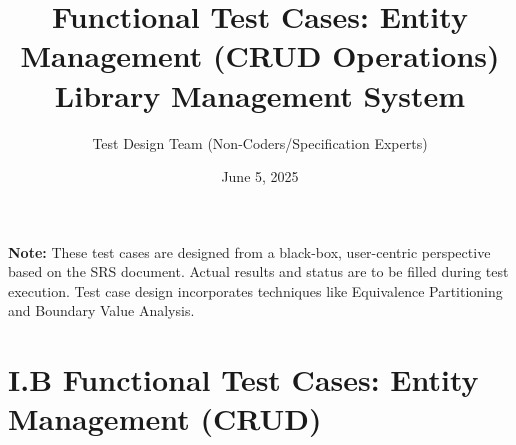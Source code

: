 \documentclass[10pt, a4paper]{report}
\title{Functional Test Cases: Entity Management (CRUD Operations) \\ \large Library Management System}
\author{Test Design Team (Non-Coders/Specification Experts)}
\date{June 5, 2025}
\begin{document}
\maketitle
\begin{center}
    \textbf{Note:} These test cases are designed from a black-box, user-centric perspective based on the SRS document. Actual results and status are to be filled during test execution. Test case design incorporates techniques like Equivalence Partitioning and Boundary Value Analysis.
\end{center}

\section*{I.B Functional Test Cases: Entity Management (CRUD)}
\end{document}
